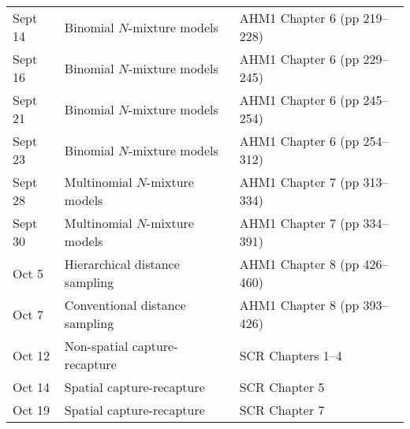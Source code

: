 \documentclass[12pt]{article}
\begin{document}
\begin{center}
\begin{tabular}[c]{lll}
Sept 14    & Binomial $N$-mixture models                  & AHM1 Chapter 6 (pp 219--228)                         \\
Sept 16    & Binomial $N$-mixture models                  & AHM1 Chapter 6 (pp 229--245)                         \\
\hline
Sept 21    & Binomial $N$-mixture models                  & AHM1 Chapter 6 (pp 245--254)                         \\
Sept 23    & Binomial $N$-mixture models                  & AHM1 Chapter 6 (pp 254--312)                         \\
\hline
Sept 28    & Multinomial $N$-mixture models               & AHM1 Chapter 7 (pp 313--334)                         \\
Sept 30    & Multinomial $N$-mixture models               & AHM1 Chapter 7 (pp 334--391)                         \\
\hline
Oct 5     & Hierarchical distance sampling               & AHM1 Chapter 8 (pp 426--460)                          \\
Oct 7     & Conventional distance sampling               & AHM1 Chapter 8 (pp 393--426)                         \\
\hline
Oct 12     & Non-spatial capture-recapture                & SCR Chapters 1--4                         \\
Oct 14     & Spatial capture-recapture                    & SCR Chapter 5                                \\
\hline
Oct 19     & Spatial capture-recapture                    & SCR Chapter 7                                        \\

\end{tabular}
\end{center}
\end{document}

